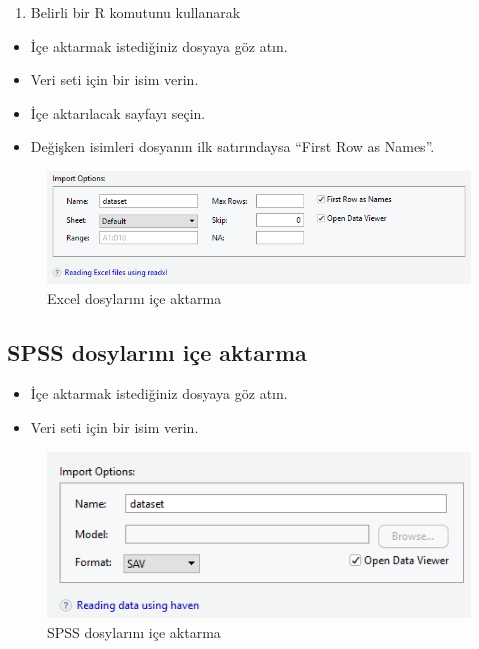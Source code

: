 \documentclass[
  oneside]{book}
\providecommand{\tightlist}{%
  \setlength{\itemsep}{0pt}\setlength{\parskip}{0pt}}
\begin{document}
\begin{enumerate}
\def\labelenumi{\arabic{enumi}.}
\setcounter{enumi}{1}
\tightlist
\item
  Belirli bir R komutunu kullanarak
\end{enumerate}

\begin{itemize}
\item
  İçe aktarmak istediğiniz dosyaya göz atın.
\item
  Veri seti için bir isim verin.
\item
  İçe aktarılacak sayfayı seçin.
\item
  Değişken isimleri dosyanın ilk satırındaysa ``First Row as Names''.
\end{itemize}

\begin{figure}
\centering
\includegraphics{images/excel1.png}
\caption{Excel dosylarını içe aktarma}
\end{figure}

\hypertarget{spss-dosylarux131nux131-iuxe7e-aktarma}{%
\subsection{SPSS dosylarını içe aktarma}\label{spss-dosylarux131nux131-iuxe7e-aktarma}}

\begin{itemize}
\item
  İçe aktarmak istediğiniz dosyaya göz atın.
\item
  Veri seti için bir isim verin.
\end{itemize}

\begin{figure}
\centering
\includegraphics{images/spss1.png}
\caption{SPSS dosylarını içe aktarma}
\end{figure}
\end{document}
